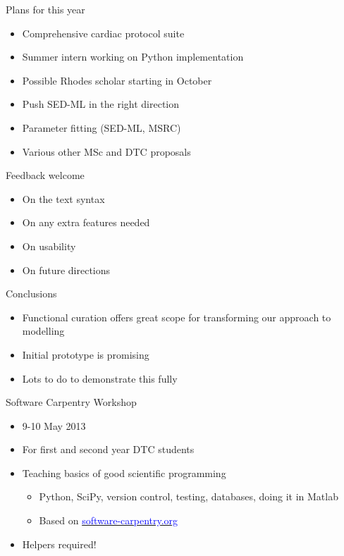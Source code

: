 \documentclass[t,xcolor={usenames,dvipsnames}]{beamer}
\newcommand{\myhref}[2]{\href{#1}{\textcolor{Blue}{#2}}}
\begin{document}
\begin{frame}{Plans for this year}
\begin{itemize}
\item Comprehensive cardiac protocol suite
\item Summer intern working on Python implementation
\item Possible Rhodes scholar starting in October
\item Push SED-ML in the right direction
\item Parameter fitting (SED-ML, MSRC)
\item Various other MSc and DTC proposals
\end{itemize}
\end{frame}


\begin{frame}{Feedback welcome}
\begin{itemize}
\item On the text syntax
\item On any extra features needed
\item On usability
\item On future directions
\end{itemize}
\end{frame}


\begin{frame}{Conclusions}
\begin{itemize}
\item Functional curation offers great scope for transforming our approach to modelling
\item Initial prototype is promising
\item Lots to do to demonstrate this fully
\end{itemize}
\end{frame}


\begin{frame}{Software Carpentry Workshop}
\begin{itemize}
\item 9-10 May 2013
\item For first and second year DTC students
\item Teaching basics of good scientific programming
  \begin{itemize}
  \item Python, SciPy, version control, testing, databases, doing it in Matlab
  \item Based on \myhref{http://software-carpentry.org/}{software-carpentry.org}
  \end{itemize}
\item Helpers required!
\end{itemize}
\end{frame}
\end{document}
